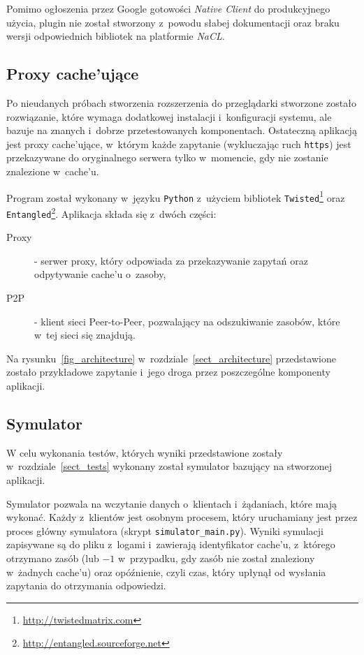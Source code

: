 \documentclass[a4paper,11pt]{scrartcl}
\newcommand{\f}{\texttt}
\newcommand{\s}{ }
\newcommand{\keszu}{cache'u}
\newcommand{\keszujace}{cache'ujące}
\begin{document}
Pomimo ogłoszenia przez Google gotowości \textit{Native Client} do produkcyjnego użycia, plugin nie został stworzony z~powodu słabej dokumentacji oraz braku wersji odpowiednich bibliotek na platformie \textit{NaCL}.

\subsection{Proxy \keszujace}
\label{sect_impl_proxy}
Po nieudanych próbach stworzenia rozszerzenia do przeglądarki stworzone zostało rozwiązanie, które wymaga dodatkowej instalacji i~konfiguracji systemu, ale bazuje na znanych i~dobrze przetestowanych komponentach. Ostateczną aplikacją jest proxy \keszujace, w~którym każde zapytanie (wykluczając ruch \f{https}) jest przekazywane do oryginalnego serwera tylko w~momencie, gdy nie zostanie znalezione w~\keszu.

Program został wykonany w~języku \f{Python} z~użyciem bibliotek \f{Twisted}\footnote{\url{http://twistedmatrix.com}} oraz \f{Entangled}\footnote{\url{http://entangled.sourceforge.net}}. Aplikacja składa się z~dwóch części:
\begin{description}
  \item[Proxy]{ - serwer proxy, który odpowiada za przekazywanie zapytań oraz odpytywanie \keszu\s o~zasoby,}
  \item[P2P]{ - klient sieci Peer-to-Peer, pozwalający na odszukiwanie zasobów, które w~tej sieci się znajdują.}
\end{description}
Na rysunku~\ref{fig_architecture} w~rozdziale~\ref{sect_architecture} przedstawione zostało przykładowe zapytanie i~jego droga przez poszczególne komponenty aplikacji. 

\subsection{Symulator}
\label{sect_impl_simulator}
W celu wykonania testów, których wyniki przedstawione zostały w~rozdziale~\ref{sect_tests} wykonany został symulator bazujący na stworzonej aplikacji. 

Symulator pozwala na wczytanie danych o~klientach i~żądaniach, które mają wykonać. Każdy z~klientów jest osobnym procesem, który uruchamiany jest przez proces główny symulatora (skrypt \f{simulator\_main.py}). Wyniki symulacji zapisywane są do pliku z~logami i~zawierają identyfikator \keszu, z~którego otrzymano zasób (lub $-1$ w~przypadku, gdy zasób nie został znaleziony w~żadnych \keszu) oraz opóźnienie, czyli czas, który upłynął od wysłania zapytania do otrzymania odpowiedzi.
\end{document}

